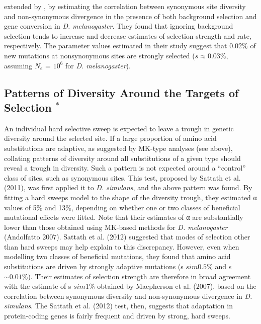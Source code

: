 extended by \cite{RN323}, by estimating the correlation between synonymous site diversity and non-synonymous divergence in the presence of both background selection and gene conversion in \textit{D. melanogaster}. They found that ignoring background selection tends to increase and decrease estimates of selection strength and rate, respectively. The parameter values estimated in their study suggest that 0.02\% of new mutations at nonsynonymous sites are strongly selected ($s \approx 0.03\%$, assuming $N_e$ = $10^6$ for \textit{D. melanogaster}).
 
\subsection[Patterns of Diversity Around the Targets of Selection]{Patterns of Diversity Around the Targets of Selection $^*$}
 
An individual hard selective sweep is expected to leave a trough in genetic diversity around the selected site. If a large proportion of amino acid substitutions are adaptive, as suggested by MK-type analyses (see above), collating patterns of diversity around all substitutions of a given type should reveal a trough in diversity. Such a pattern is not expected around a “control” class of sites, such as synonymous sites. This test, proposed by Sattath et al. (2011), was first applied it to \textit{D. simulans}, and the above pattern was found. By fitting a hard sweeps model to the shape of the diversity trough, they estimated α values of  5\% and 13\%, depending on whether one or two classes of beneficial mutational effects were fitted. Note that their estimates of α are substantially lower than those obtained using MK-based methods for \textit{D. melanogaster} (Andolfatto 2007). Sattath et al. (2012) suggested that modes of selection other than hard sweeps may help explain to this discrepancy. However, even when modelling two classes of beneficial mutations, they found that amino acid substitutions are driven by strongly adaptive mutations (s $sim0.5\%$ and s $\sim0.01\%$). Their estimates of selection strength are therefore in broad agreement with the estimate of s $sim1\%$ obtained by Macpherson et al. (2007), based on the correlation between synonymous diversity and non-synonymous divergence in \textit{D. simulans}. The Sattath et al. (2012) test, then, suggests that adaptation in protein-coding genes is fairly frequent and driven by strong, hard sweeps.
 
